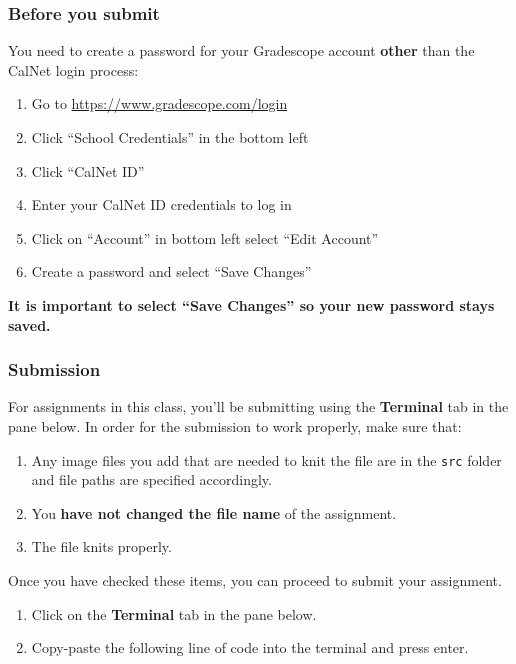 \documentclass[
]{article}
\providecommand{\tightlist}{%
  \setlength{\itemsep}{0pt}\setlength{\parskip}{0pt}}
\begin{document}
\newpage

\subsubsection{Before you submit}\label{before-you-submit}

You need to create a password for your Gradescope account \textbf{other}
than the CalNet login process:

\begin{enumerate}
\def\labelenumi{\arabic{enumi}.}
\tightlist
\item
  Go to \url{https://www.gradescope.com/login}
\item
  Click ``School Credentials'' in the bottom left
\item
  Click ``CalNet ID''
\item
  Enter your CalNet ID credentials to log in
\item
  Click on ``Account'' in bottom left select ``Edit Account''
\item
  Create a password and select ``Save Changes''
\end{enumerate}

\textbf{It is important to select ``Save Changes'' so your new password
stays saved.}

\subsubsection{Submission}\label{submission}

For assignments in this class, you'll be submitting using the
\textbf{Terminal} tab in the pane below. In order for the submission to
work properly, make sure that:

\begin{enumerate}
\def\labelenumi{\arabic{enumi}.}
\tightlist
\item
  Any image files you add that are needed to knit the file are in the
  \texttt{src} folder and file paths are specified accordingly.
\item
  You \textbf{have not changed the file name} of the assignment.
\item
  The file knits properly.
\end{enumerate}

Once you have checked these items, you can proceed to submit your
assignment.

\begin{enumerate}
\def\labelenumi{\arabic{enumi}.}
\tightlist
\item
  Click on the \textbf{Terminal} tab in the pane below.
\item
  Copy-paste the following line of code into the terminal and press
  enter.
\end{enumerate}
\end{document}
